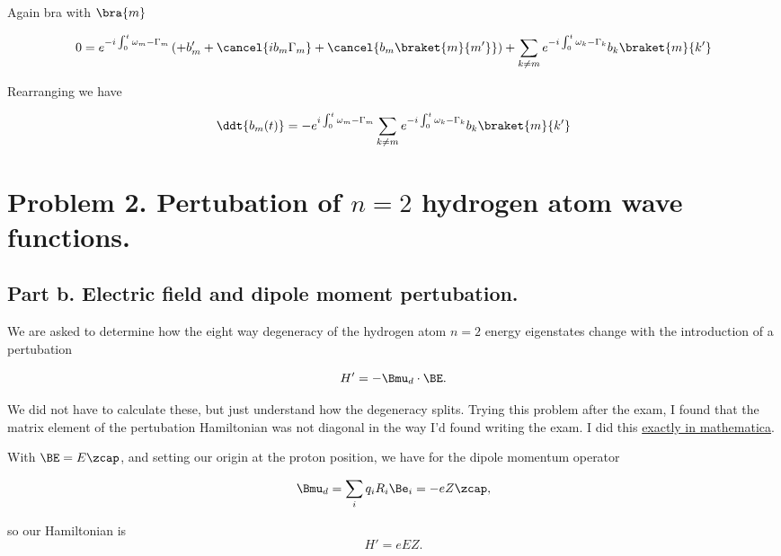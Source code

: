 Again bra with $\bra{m}$

\begin{align*}
0 
=
e^{-i \int_0^t  \omega_m - \Gamma_m } 
\left(
+ b_m' 
+ \cancel{i b_m \Gamma_m }
+ \cancel{b_m \braket{m}{m'} }
\right)
+\sum_{k\ne m} e^{-i \int_0^t  \omega_k - \Gamma_k } b_k \braket{m}{k'} 
\end{align*}

Rearranging we have

\begin{equation}\label{eqn:qmTwoExamReflection:n}
\ddt{b_m(t)} = 
-
e^{i \int_0^t  \omega_m - \Gamma_m } 
\sum_{k\ne m} e^{-i \int_0^t \omega_k - \Gamma_k } b_k \braket{m}{k'} 
\end{equation}

\section{Problem 2.  Pertubation of $n=2$ hydrogen atom wave functions.}

\subsection{Part b.  Electric field and dipole moment pertubation.}

We are asked to determine how the eight way degeneracy of the hydrogen atom $n=2$ energy eigenstates change with the introduction of a pertubation

\begin{equation}\label{eqn:qmTwoExamReflection:n}
H' = -\Bmu_d \cdot \BE.
\end{equation}

We did not have to calculate these, but just understand how the degeneracy splits.  Trying this problem after the exam, I found that the matrix element of the pertubation Hamiltonian was not diagonal in the way I'd found writing the exam.  I did this \href{https://github.com/peeterjoot/physicsplay/blob/master/notes/phy456/qmTwoExamReflection.cdf}{exactly in mathematica}.

With $\BE = E \zcap$, and setting our origin at the proton position, we have for the dipole momentum operator

\begin{equation}\label{eqn:qmTwoExamReflection:n}
\Bmu_d = \sum_i q_i R_i \Be_i = - e Z \zcap,
\end{equation}

so our Hamiltonian is
\begin{equation}\label{eqn:qmTwoExamReflection:n}
H' = e E Z.
\end{equation}


